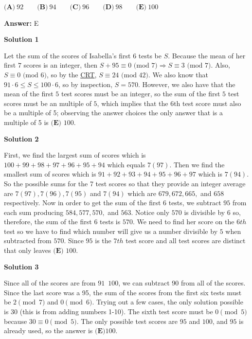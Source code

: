 \begin{enumerate}
 $\textbf{(A)}\ 92\qquad\textbf{(B)}\ 94\qquad\textbf{(C)}\ 96\qquad\textbf{(D)}\ 98\qquad\textbf{(E)}\ 100$

 \textbf{Answer: }E



\textbf{Solution 1}

Let the sum of the scores of Isabella's first $6$ tests be $S$. Because the mean of her first $7$ scores is an integer, then $S + 95 \equiv 0 \text{ (mod 7)} \Rightarrow S \equiv3 \text{ (mod 7)}$. Also, $S \equiv 0 \text{ (mod 6)}$, so by the \href{https://artofproblemsolving.com/wiki/index.php?title=CRT}{CRT}, $S \equiv 24 \text{ (mod 42)}$. We also know that $91 \cdot 6 \leq S \leq 100 \cdot 6$, so by inspection, $S = 570$. However, we also have that the mean of the first $5$ test scores must be an integer, so the sum of the first $5$ test scores must be an multiple of $5$, which implies that the $6$th test score must also be a multiple of 5; observing the answer choices the only answer that is a multiple of 5 is $\boxed{\textbf{(E) } 100}$.

 



\textbf{Solution 2}

First, we find the largest sum of scores which is $100+99+98+97+96+95+94$ which equals $7(97)$. Then we find the smallest sum of scores which is $91+92+93+94+95+96+97$ which is $7(94)$. So the possible sums for the 7 test scores so that they provide an integer average are $7(97), 7(96), 7(95)$ and $7(94)$ which are $679, 672, 665,$ and $658$ respectively.  Now in order to get the sum of the first 6 tests, we subtract $95$ from each sum producing $584, 577, 570,$ and $563$. Notice only $570$ is divisible by $6$ so, therefore, the sum of the first $6$ tests is $570$. We need to find her score on the $6th$ test so we have to find which number will give us a number divisible by $5$ when subtracted from $570.$ Since $95$ is the $7th$ test score and all test scores are distinct that only leaves $\boxed{\textbf{(E) } 100}$.

 



\textbf{Solution 3}

Since all of the scores are from $91$~$100$, we can subtract 90 from all of the scores. Since the last score was a 95, the sum of the scores from the first six tests must be $2 \pmod 7$ and $0 \pmod 6$. Trying out a few cases, the only solution possible is 30 (this is from adding numbers 1-10). The sixth test score must be $0 \pmod 5$ because $30\equiv 0\pmod5$. The only possible test scores are $95$ and $100$, and $95$ is already used, so the answer is $\boxed{\textbf{(E)}100}$.


\end{enumerate}
